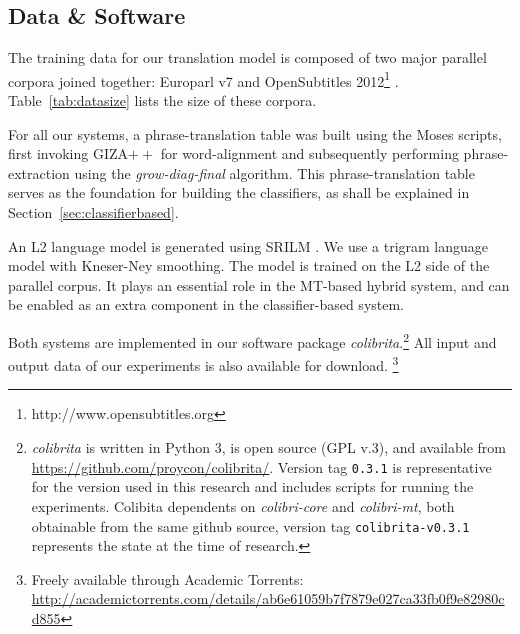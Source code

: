 \subsection{Data \& Software}

The training data for our translation model is composed of two major
parallel corpora joined together: Europarl v7 \citep{EUROPARL} and
OpenSubtitles 2012\footnote{http://www.opensubtitles.org}
\citep{OPUS2012}.  Table~\ref{tab:datasize} lists the size of these
corpora.

\begin{table}[htb]
\caption{Corpora sizes for all of the language pairs}
\label{tab:datasize}
\noindent{}
\end{table}

For all our systems, a phrase-translation table was built using the Moses
scripts, first invoking GIZA$++$ for word-alignment and subsequently performing
phrase-extraction using the \emph{grow-diag-final} algorithm. This
phrase-translation table serves as the foundation for building the classifiers,
as shall be explained in Section~\ref{sec:classifierbased}.

An L2 language model is generated using SRILM \citep{SRILM}. We use a trigram
language model with Kneser-Ney smoothing. The model is trained on the L2 side
of the parallel corpus. It plays an essential role in the MT-based hybrid system,
and can be enabled as an extra component in the classifier-based system.

Both systems are implemented in our software package
\emph{colibrita}.\footnote{\emph{colibrita} is written in Python 3, is open source
  (GPL v.3), and available from
  \url{https://github.com/proycon/colibrita/}. Version tag
  \texttt{0.3.1} is representative for the version used in this
  research and includes scripts for running the experiments.
  Colibita dependents on \emph{colibri-core} and \emph{colibri-mt}, both obtainable from the same github source, version tag \texttt{colibrita-v0.3.1} represents the state at
  the time of research.
  }
All input and output data of our experiments is also available for
download. \footnote{Freely available through Academic Torrents: \url{http://academictorrents.com/details/ab6e61059b7f7879e027ca33fb0f9e82980cd855} }

